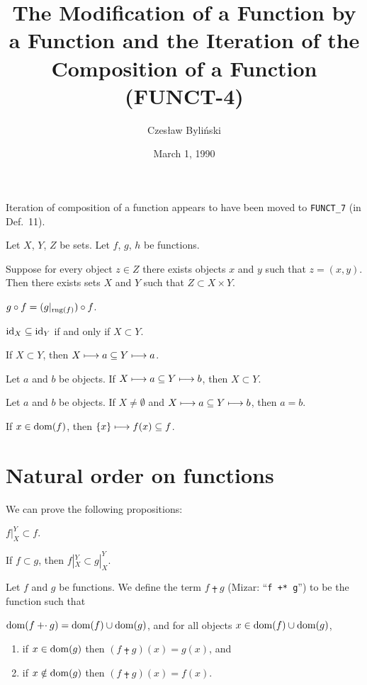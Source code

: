 \documentclass{article}
\title[Modification of a Function by a Function (FUNCT-4)]{The Modification of a Function by a Function and the Iteration of the Composition of a Function (FUNCT-4)}
\author{Czes{\l}aw Byli\'nski}
\date{March 1, 1990}
\begin{document}
\maketitle

\begin{remark}
Iteration of composition of a function appears to have been moved to
\verb#FUNCT_7# (in Def.~11).
\end{remark}

Let $X$, $Y$, $Z$ be sets. Let $f$, $g$, $h$ be functions.
\begin{thm}
\item\label{funct4:1} Suppose for every object $z\in Z$ there exists
  objects $x$ and $y$ such that $z=(x,y)$.
  Then there exists sets $X$ and $Y$ such that $Z\subset X\times Y$.
\item\label{funct4:2} $g\circ f=(g|_{\operatorname{rng}(f)})\circ f$.
\item\label{funct4:3} $\operatorname{id}_{X}\subseteq\operatorname{id}_{Y}$ if and only if $X\subset Y$.
\item\label{funct4:4} If $X\subset Y$, then $X\longmapsto a\subseteq Y\longmapsto a$.
\item\label{funct4:5} Let $a$ and $b$ be objects.
  If $X\longmapsto a\subseteq Y\longmapsto b$, then $X\subset Y$.
\item\label{funct4:6} Let $a$ and $b$ be objects.
  If $X\neq\emptyset$ and $X\longmapsto a\subseteq Y\longmapsto b$,
  then $a=b$.
\item\label{funct4:7} If $x\in\operatorname{dom}(f)$,
  then $\{x\}\longmapsto f(x)\subseteq f$.
\end{thm}

\section{Natural order on functions}

We can prove the following propositions:
\begin{thm}
\item\label{funct4:8} $f|^{Y}_{X}\subset f$.
\item\label{funct4:9} If $f\subset g$, then $f|^{Y}_{X}\subset g|^{Y}_{X}$.
\end{thm}

\begin{definition}
Let $f$ and $g$ be functions.
We define the term $f\plusdot g$ (Mizar: ``\verb#f +* g#'') to be the function such that
\begin{defn}
\item $\operatorname{dom}(f \mathbin{\mathord{+}\cdot} g)=\operatorname{dom}(f)\cup\operatorname{dom}(g)$, and
  for all objects $x\in\operatorname{dom}(f)\cup\operatorname{dom}(g)$,
\begin{enumerate}[label=(\roman*)]
\item if $x\in\operatorname{dom}(g)$ then $(f\plusdot g)(x)=g(x)$, and
\item if $x\notin\operatorname{dom}(g)$ then $(f\plusdot g)(x)=f(x)$.
\end{enumerate}
\end{defn}
\end{definition}
\end{document}
